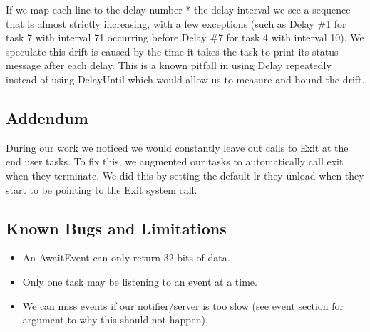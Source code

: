 \documentclass{article}
\begin{document}
If we map each line to the delay number * the delay interval we see a sequence that is almost strictly increasing, with a few exceptions (such as Delay \#1 for task 7 with interval 71 occurring before Delay \#7 for task 4 with interval 10).  We speculate this drift is caused by the time it takes the task to print its status message after each delay. This is a known pitfall in using Delay repeatedly instead of using DelayUntil which would allow us to measure and bound the drift. 

\subsection{Addendum}

During our work we noticed we would constantly leave out calls to Exit at the end user tasks. To fix this, we augmented our tasks to automatically call exit when they terminate. We did this by setting the default lr they unload when they start to be pointing to the Exit system call.

\subsection{Known Bugs and Limitations}
\begin{itemize}
    \item An AwaitEvent can only return 32 bits of data.
    \item Only one task may be listening to an event at a time.
    \item We can miss events if our notifier/server is too slow (see event section for argument to why this should not happen).
\end{itemize}
\end{document}
